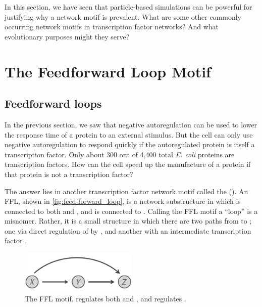 In this section, we have seen that particle-based simulations can be powerful for justifying why a network motif is prevalent. What are some other commonly occurring network motifs in transcription factor networks? And what evolutionary purposes might they serve?\\


\FloatBarrier
{}

\section{The Feedforward Loop Motif}
\label{sec:the_feedforward_loop_motif}

\subsection{Feedforward loops}

In the previous section, we saw that negative autoregulation can be used to lower the response time of a protein to an external stimulus. But the cell can only use negative autoregulation to respond quickly if the autoregulated protein is itself a transcription factor. Only about 300 out of 4,400 total \textit{E. coli} proteins are transcription factors. How can the cell speed up the manufacture of a protein if that protein is not a transcription factor?

The answer lies in another transcription factor network motif called the  (). An FFL, shown in \autoref{fig:feed-forward_loop}, is a network substructure in which  is connected to both  and , and  is connected to . Calling the FFL motif a ``loop'' is a misnomer. Rather, it is a small structure in which there are two paths from  to ; one via direct regulation of  by , and another with an intermediate transcription factor .\\

\begin{figure}[h]
\centering
\mySfFamily
\includegraphics[width = 0.5\textwidth]{../images/feed-forward_loop.png}
\caption{The FFL motif.  regulates both  and , and  regulates .}
\label{fig:feed-forward_loop}
\end{figure}


